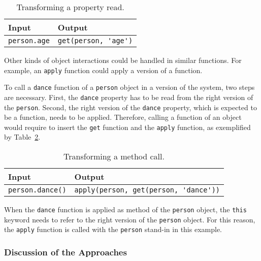 \begin{table}[h]
\begin{center}
\begin{tabular}{| l | l |}
    \hline
    Input & Output \\ \hline
    \lstinline|person.age| & \lstinline|get(person, 'age')| \\ \hline
\end{tabular}
\end{center}
\caption[Table caption text]{Transforming a property read.}
\label{table:transformingReads}
\end{table}


Other kinds of object interactions could be handled in similar functions.
For example, an \lstinline{apply} function could apply a version of a function.

To call a \lstinline{dance} function of a \lstinline{person} object in a version of the system, two steps are necessary.
First, the \lstinline{dance} property has to be read from the right version of the \lstinline{person}.
Second, the right version of the \lstinline{dance} property, which is expected to be a function, needs to be applied.
Therefore, calling a function of an object would require to insert the \lstinline{get} function and the \lstinline{apply} function, as exemplified by Table~\ref{table:transformingMethodCall}.

\begin{table}[h]
\begin{center}
\begin{tabular}{| l | l |}
    \hline
    Input & Output \\ \hline
    \lstinline|person.dance()| & \lstinline|apply(person, get(person, 'dance'))| \\ \hline
\end{tabular}
\end{center}
\caption[Table caption text]{Transforming a method call.}
\label{table:transformingMethodCall}
\end{table}

When the \lstinline{dance} function is applied as method of the \lstinline{person} object, the \lstinline{this} keyword needs to refer to the right version of the \lstinline{person} object.
For this reason, the \lstinline{apply} function is called with the \lstinline{person} stand-in in this example.

\subsubsection{Discussion of the Approaches}


